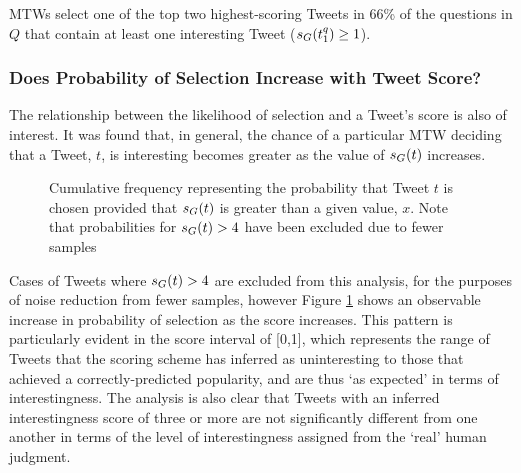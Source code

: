 \begin{myobservation}
    MTWs select one of the top two highest-scoring Tweets in 66\% of the questions in $Q$ that contain at least one interesting Tweet ($s_G(t^q_1) \geq 1$).  
\end{myobservation}


\subsubsection{Does Probability of Selection Increase with Tweet Score?}
The relationship between the likelihood of selection and a Tweet's score is also of interest. It was found that, in general, the chance of a particular MTW deciding that a Tweet, $t$, is interesting becomes greater as the value of $s_G(t)$ increases. 

\begin{figure}[h]
\centering
{}
\caption{Cumulative frequency representing the probability that Tweet $t$ is chosen provided that $s_G(t)$ is greater than a given value, $x$. Note that probabilities for $s_G(t) > 4$ have been excluded due to fewer samples}
\label{fig:score-cum-dist}
\end{figure}

Cases of Tweets where $s_G(t) > 4$ are excluded from this analysis, for the purposes of noise reduction from fewer samples, however Figure \ref{fig:score-cum-dist} shows an observable increase in probability of selection as the score increases. This pattern is particularly evident in the score interval of [0,1], which represents the range of Tweets that the scoring scheme has inferred as uninteresting to those that achieved a correctly-predicted popularity, and are thus `as expected' in terms of interestingness. The analysis is also clear that Tweets with an inferred interestingness score of three or more are not significantly different from one another in terms of the level of interestingness assigned from the `real' human judgment.


